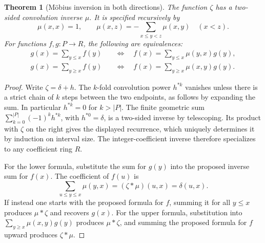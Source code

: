 \documentclass[11pt,oneside,openany]{book}
\theoremstyle{plain}
\newtheorem{theorem}{Theorem}[chapter]
\theoremstyle{definition}
\theoremstyle{remark}
\begin{document}
\begin{theorem}[Möbius inversion in both directions]\label{p204:W08}
The function \(\zeta\) has a two-sided convolution inverse \(\mu\).
It is specified recursively by
\[
 \mu(x,x)=1,\qquad
 \mu(x,z)=-\sum_{x\le y<z}\mu(x,y)\quad(x<z).
\]
For functions \(f,g:P\to R\), the following are equivalences:
\[
\begin{aligned}
 g(x)=\sum_{y\le x}f(y)
 &\quad\Longleftrightarrow\quad
 f(x)=\sum_{y\le x}\mu(y,x)g(y),\\
 g(x)=\sum_{y\ge x}f(y)
 &\quad\Longleftrightarrow\quad
 f(x)=\sum_{y\ge x}\mu(x,y)g(y).
\end{aligned}
\]
\end{theorem}
\begin{proof}
Write \(\zeta=\delta+h\). The \(k\)-fold convolution power \(h^{*k}\)
vanishes unless there is a strict chain of \(k\) steps between the two
endpoints, as follows by expanding the sum. In particular
\(h^{*k}=0\) for \(k>|P|\). The finite geometric sum
\(\sum_{k=0}^{|P|}(-1)^kh^{*k}\), with \(h^{*0}=\delta\), is a
two-sided inverse by telescoping. Its product with \(\zeta\) on the
right gives the displayed recurrence, which uniquely determines it
by induction on interval size. The integer-coefficient inverse
therefore specializes to any coefficient ring \(R\).

For the lower formula, substitute the sum for \(g(y)\) into
the proposed inverse sum for \(f(x)\). The coefficient of \(f(u)\) is
\[
 \sum_{u\le y\le x}\mu(y,x)=(\zeta*\mu)(u,x)=\delta(u,x).
\]
If instead one starts with the proposed formula for \(f\), summing
it for all \(y\le x\) produces \(\mu*\zeta\) and recovers \(g(x)\).
For the upper formula, substitution into
\(\sum_{y\ge x}\mu(x,y)g(y)\) produces \(\mu*\zeta\), and summing the
proposed formula for \(f\) upward produces \(\zeta*\mu\).
\end{proof}
\end{document}

